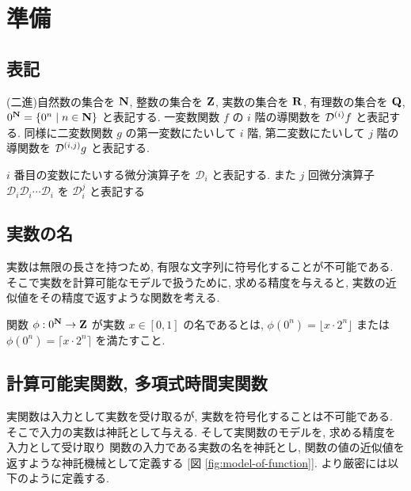 \section{準備}


\subsection{表記}
(二進)自然数の集合を $\mathbf N$, 整数の集合を $\mathbf Z$, 実数の集合を $\mathbf R$, 
有理数の集合を $\mathbf Q$, $0^\mathbf N = \{0^n \mid n \in \mathbf N\}$ と表記する. 
一変数関数 $f$ の $i$ 階の導関数を $\mathcal D^{(i)}f$ と表記する.
同様に二変数関数 $g$ の第一変数にたいして $i$ 階, 第二変数にたいして $j$ 階の導関数を $\mathcal D^{(i,j)}g$ と表記する.

$i$ 番目の変数にたいする微分演算子を $\mathcal D_i$ と表記する.
また $j$ 回微分演算子 $\mathcal D_i \mathcal D_i \cdots \mathcal D_i$ を
$\mathcal D^j_i$ と表記する


\subsection{実数の名}
 実数は無限の長さを持つため, 有限な文字列に符号化することが不可能である.
 そこで実数を計算可能なモデルで扱うために, 
 求める精度を与えると, 実数の近似値をその精度で返すような関数を考える.

\begin{definition}[実数の名]
 関数 $\phi : 0^\mathbf N \to \mathbf Z $ が実数 $x \in [0,1]$ の名であるとは,
 $\phi(0^n) = \lfloor x \cdot 2^n \rfloor$ または
 $\phi(0^n) = \lceil x \cdot 2^n \rceil$ を満たすこと.
\end{definition}

\subsection{計算可能実関数, 多項式時間実関数}
 実関数は入力として実数を受け取るが, 実数を符号化することは不可能である.
 そこで入力の実数は神託として与える.
 そして実関数のモデルを, 求める精度を入力として受け取り
 関数の入力である実数の名を神託とし, 関数の値の近似値を返すような神託機械として定義する
 [図 \ref{fig:model-of-function}].
 より厳密には以下のように定義する.

